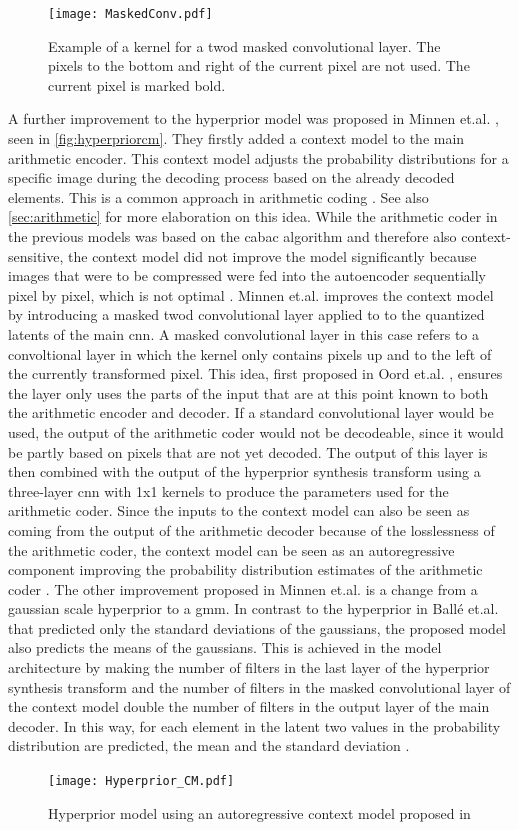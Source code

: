 \begin{figure}
\centering
\texttt{[image: MaskedConv.pdf]}
\caption[Example of masked convolutional layer]{Example of a kernel for a \ac{twod} masked convolutional layer. The pixels to the bottom and right of the current pixel are not used. The current pixel is marked bold.}
\label{fig:maskedconv}
\end{figure}

A further improvement to the hyperprior model was proposed in Minnen et.al. \citep{minnen_joint_2018}, seen in \autoref{fig:hyperpriorcm}. They firstly added a context model to the main arithmetic encoder. This context model adjusts the probability distributions for a specific image during the decoding process based on the already decoded elements. This is a common approach in arithmetic coding \citep{said_introduction_2023}. See also \autoref{sec:arithmetic} for more elaboration on this idea. While the arithmetic coder in the previous models was based on the \ac{cabac} algorithm and therefore also context-sensitive, the context model did not improve the model significantly because images that were to be compressed were fed into the autoencoder sequentially pixel by pixel, which is not optimal \citep{balle_end--end_2017}. Minnen et.al. improves the context model by introducing a masked \ac{twod} convolutional layer applied to to the quantized latents of the main \ac{cnn}. A masked convolutional layer in this case refers to a convoltional layer in which the kernel only contains pixels up and to the left of the currently transformed pixel. This idea, first proposed in Oord et.al. \citep{oord_conditional_2016}, ensures the layer only uses the parts of the input that are at this point known to both the arithmetic encoder and decoder. If a standard convolutional layer would be used, the output of the arithmetic coder would not be decodeable, since it would be partly based on pixels that are not yet decoded.  The output of this layer is then combined with the output of the hyperprior synthesis transform using a three-layer \ac{cnn} with 1x1 kernels to produce the parameters used for the arithmetic coder. Since the inputs to the context model can also be seen as coming from the output of the arithmetic decoder because of the losslessness of the arithmetic coder, the context model can be seen as an autoregressive component improving the probability distribution estimates of the arithmetic coder \citep{minnen_joint_2018}. The other improvement proposed in Minnen et.al. \citep{minnen_joint_2018} is a change from a gaussian scale hyperprior to a \ac{gmm}. In contrast to the hyperprior in Ballé et.al. \citep{balle_variational_2018} that predicted only the standard deviations of the gaussians, the proposed model also predicts the means of the gaussians. This is achieved in the model architecture by making the number of filters in the last layer of the hyperprior synthesis transform and the number of filters in the masked convolutional layer of the context model double the number of filters in the output layer of the main decoder. In this way, for each element in the latent two values in the probability distribution are predicted, the mean and the standard deviation \citep{minnen_joint_2018}.

\begin{figure}
\centering
\texttt{[image: Hyperprior\_CM.pdf]}
\caption[Joint hyperprior architecture]{Hyperprior model using an autoregressive context model proposed in \citep{minnen_joint_2018}}
\label{fig:hyperpriorcm}
\end{figure}